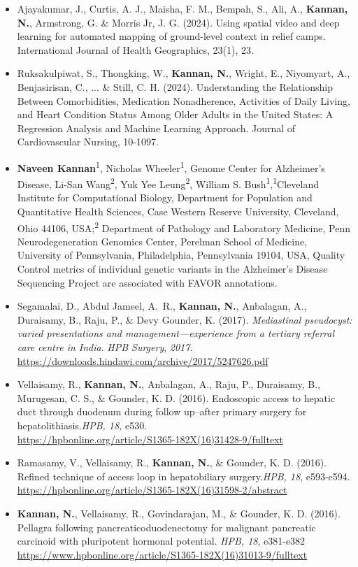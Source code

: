 
\begin{itemize}
    \item Ajayakumar, J., Curtis, A. J., Maisha, F. M., Bempah, S., Ali, A., \textbf{Kannan, N.}, Armstrong, G. \& Morris Jr, J. G. (2024). Using spatial video and deep learning for automated mapping of ground-level context in relief camps. International Journal of Health Geographics, 23(1), 23. 
    \item Ruksakulpiwat, S., Thongking, W., \textbf{Kannan, N.}, Wright, E., Niyomyart, A., Benjasirisan, C., ... \& Still, C. H. (2024). Understanding the Relationship Between Comorbidities, Medication Nonadherence, Activities of Daily Living, and Heart Condition Status Among Older Adults in the United States: A Regression Analysis and Machine Learning Approach. Journal of Cardiovascular Nursing, 10-1097.
    \item \textbf{Naveen Kannan}\textsuperscript{1}, Nicholas Wheeler\textsuperscript{1}, Genome Center for Alzheimer’s Disease, Li-San Wang\textsuperscript{2}, Yuk Yee Leung\textsuperscript{2}, William S. Bush\textsuperscript{1},\textsuperscript{1}Cleveland Institute for Computational Biology, Department for Population and Quantitative Health Sciences, Case Western Reserve University, Cleveland, Ohio 44106, USA;\textsuperscript{2} Department of Pathology and Laboratory Medicine, Penn Neurodegeneration Genomics Center, Perelman School of Medicine, University of Pennsylvania, Philadelphia, Pennsylvania 19104, USA, Quality Control metrics of individual genetic variants in the Alzheimer’s Disease Sequencing Project are associated with FAVOR annotations.
    \item Segamalai, D., Abdul Jameel, A.~R., \textbf{Kannan, N.}, Anbalagan, A., Duraisamy, B., Raju, P., \& Devy Gounder, K. (2017). \textit{Mediastinal pseudocyst: varied presentations and management---experience from a tertiary referral care centre in India}. \textit{HPB Surgery}, \textit{2017}.\\\url{https://downloads.hindawi.com/archive/2017/5247626.pdf}
    \item Vellaisamy, R., \textbf{Kannan, N.}, Anbalagan, A., Raju, P., Duraisamy, B., Murugesan, C. S., \& Gounder, K. D. (2016). Endoscopic access to hepatic duct through duodenum during follow up--after primary surgery for hepatolithiasis.\textit{HPB, 18,} e530.\\\url{https://hpbonline.org/article/S1365-182X(16)31428-9/fulltext}
    \item Ramasamy, V., Vellaisamy, R., \textbf{Kannan, N.}, \& Gounder, K. D. (2016). Refined technique of access loop in hepatobiliary surgery.\textit{HPB, 18}, e593-e594. \\\url{https://hpbonline.org/article/S1365-182X(16)31598-2/abstract}
    \item \textbf{Kannan, N.}, Vellaisamy, R., Govindarajan, M., \& Gounder, K. D. (2016). Pellagra following pancreaticoduodenectomy for malignant pancreatic carcinoid with pluripotent hormonal potential. \textit{HPB, 18}, e381-e382 \\\url{https://www.hpbonline.org/article/S1365-182X(16)31013-9/fulltext}
    
\end{itemize}



